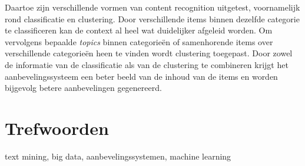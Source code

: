 {Daartoe zijn verschillende vormen van content recognition uitgetest, voornamelijk rond classificatie en clustering. Door verschillende items binnen dezelfde categorie te classificeren kan de context al heel wat duidelijker afgeleid worden. Om vervolgens bepaalde \textit{topics} binnen categorie\"en of samenhorende items over verschillende categorie\"en heen te vinden wordt clustering toegepast. Door zowel de informatie van de classificatie als van de clustering te combineren krijgt het aanbevelingssysteem een beter beeld van de inhoud van de items en worden bijgevolg betere aanbevelingen gegenereerd.

\section*{Trefwoorden}

text mining, big data, aanbevelingssystemen, machine learning

}

\newpage %




